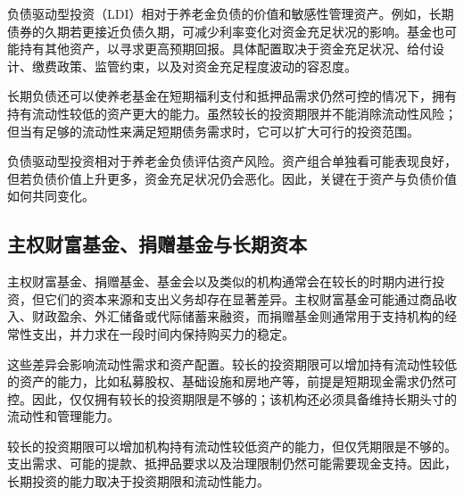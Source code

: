 负债驱动型投资（LDI）相对于养老金负债的价值和敏感性管理资产。例如，长期债券的久期若更接近负债久期，可减少利率变化对资金充足状况的影响。基金也可能持有其他资产，以寻求更高预期回报。具体配置取决于资金充足状况、给付设计、缴费政策、监管约束，以及对资金充足程度波动的容忍度。

长期负债还可以使养老基金在短期福利支付和抵押品需求仍然可控的情况下，拥有持有流动性较低的资产更大的能力。虽然较长的投资期限并不能消除流动性风险；但当有足够的流动性来满足短期债务需求时，它可以扩大可行的投资范围。

\begin{tcolorbox}[
  enhanced,
  breakable,
  colback=white,
  colframe=FinanceBlue,
  boxrule=0.7pt,
  sharp corners,
  borderline west={2.2pt}{0pt}{FinanceBlue},
  title=\textbf{财务前景：LDI专注于资金状况，而不仅仅是资产状况。},
  coltitle=white,
  colbacktitle=FinanceBlue,
  fonttitle=\bfseries,
  before skip=1.2em,
  after skip=1.2em
]

负债驱动型投资相对于养老金负债评估资产风险。资产组合单独看可能表现良好，但若负债价值上升更多，资金充足状况仍会恶化。因此，关键在于资产与负债价值如何共同变化。

\end{tcolorbox}

\subsection{主权财富基金、捐赠基金与长期资本}

主权财富基金、捐赠基金、基金会以及类似的机构通常会在较长的时期内进行投资，但它们的资本来源和支出义务却存在显著差异。主权财富基金可能通过商品收入、财政盈余、外汇储备或代际储蓄来融资，而捐赠基金则通常用于支持机构的经常性支出，并力求在一段时间内保持购买力的稳定。

这些差异会影响流动性需求和资产配置。较长的投资期限可以增加持有流动性较低的资产的能力，比如私募股权、基础设施和房地产等，前提是短期现金需求仍然可控。因此，仅仅拥有较长的投资期限是不够的；该机构还必须具备维持长期头寸的流动性和管理能力。



\begin{tcolorbox}[
  enhanced,
  breakable,
  colback=white,
  colframe=FinanceBlue,
  boxrule=0.7pt,
  sharp corners,
  borderline west={2.2pt}{0pt}{FinanceBlue},
  title=\textbf{财务前景：长远的规划并不能消除流动性方面的限制问题},
  coltitle=white,
  colbacktitle=FinanceBlue,
  fonttitle=\bfseries,
  before skip=1.2em,
  after skip=1.2em
]

较长的投资期限可以增加机构持有流动性较低资产的能力，但仅凭期限是不够的。支出需求、可能的提款、抵押品要求以及治理限制仍然可能需要现金支持。因此，长期投资的能力取决于投资期限和流动性能力。

\end{tcolorbox}


